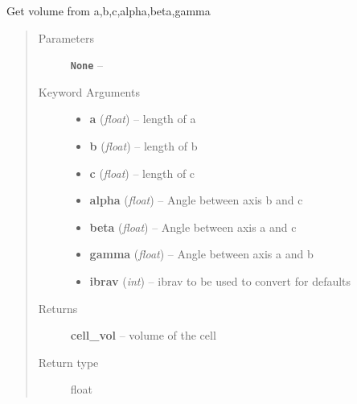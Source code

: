 \documentclass[letterpaper,10pt,english]{sphinxmanual}
\begin{document}
\begin{fulllineitems}
\label{retr:retr.abcVol}
Get volume from a,b,c,alpha,beta,gamma
\begin{quote}\begin{description}
\item[{Parameters}] \leavevmode
\textbf{\texttt{None}} -- 

\item[{Keyword Arguments}] \leavevmode\begin{itemize}
\item {} 
\textbf{a} (\emph{float}) --
length of a

\item {} 
\textbf{b} (\emph{float}) --
length of b

\item {} 
\textbf{c} (\emph{float}) --
length of c

\item {} 
\textbf{alpha} (\emph{float}) --
Angle between axis b and c

\item {} 
\textbf{beta} (\emph{float}) --
Angle between axis a and c

\item {} 
\textbf{gamma} (\emph{float}) --
Angle between axis a and b

\item {} 
\textbf{ibrav} (\emph{int}) --
ibrav to be used to convert for defaults

\end{itemize}

\item[{Returns}] \leavevmode
\textbf{cell\_vol} --
volume of the cell

\item[{Return type}] \leavevmode
float

\end{description}\end{quote}

\end{fulllineitems}

\end{document}

